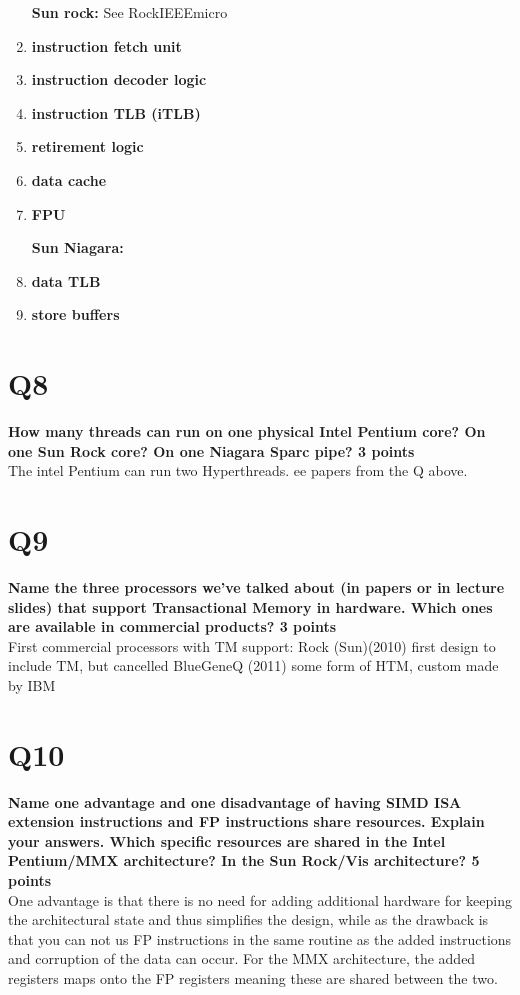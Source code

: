 \documentclass[a4paper]{article}
\begin{document}
\begin{enumerate}
\textbf{Sun rock:}
    See RockIEEEmicro
\item
\textbf{instruction fetch unit\\}
\item
\textbf{instruction decoder logic\\}
\item
\textbf{instruction TLB (iTLB)\\}
\item
\textbf{retirement logic\\}
\item
\textbf{data cache\\}
\item
\textbf{FPU\\}

\textbf{Sun Niagara:}
\item
\textbf{data TLB\\}
\item
\textbf{store buffers\\}
\end{enumerate}
\section*{Q8}
\large{\textbf{
How many threads can run on one physical Intel Pentium core? On one Sun Rock core? On one Niagara Sparc pipe? 3 points\\}}
The intel Pentium can run two Hyperthreads. ee papers from the Q above.

\section*{Q9}
\large{\textbf{
Name the three processors we’ve talked about (in papers or in lecture slides) that support Transactional Memory in hardware. Which ones are available in commercial products? 3 points\\}}
First commercial processors with TM support:
Rock (Sun)(2010) first design to include TM, but cancelled
BlueGeneQ (2011) some form of HTM, custom made by IBM

\section*{Q10}
\large{\textbf{
Name one advantage and one disadvantage of having SIMD ISA extension instructions and FP instructions share resources. Explain your answers. Which specific resources are shared in the Intel Pentium/MMX architecture? In the Sun Rock/Vis architecture? 5 points\\}}
One advantage is that there is no need for adding additional hardware for keeping the architectural state and thus simplifies the design, while as the drawback is that you can not us FP instructions in the same routine as the added instructions and corruption of the data can occur. For the MMX architecture, the added registers maps onto the FP registers meaning these are shared between the two. 
\end{document}
